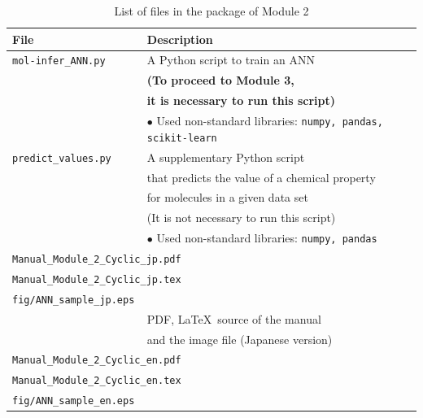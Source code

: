 \documentclass[11pt, titlepage, dvipdfmx, twoside]{article}
\begin{document}
\begin{table}[h!]
  \centering
  \caption{List of files in the package of Module 2}
  \label{tab:files}
  \begin{tabular}{lcll}
  \hline
  \bf File &\ \ & \multicolumn{2}{l}{\bf Description}\\
  \hline
  \verb|mol-infer_ANN.py| && \multicolumn{2}{l}{A Python script to train an ANN}\\
  &&\multicolumn{2}{l}{\bf (To proceed to Module 3,}\\
  &&\multicolumn{2}{l}{\bf it is necessary to run this script)}\\
  &&\multicolumn{2}{l}{$\bullet$ Used non-standard libraries: {\tt numpy, pandas, scikit-learn}}\\
  \hline
  \verb|predict_values.py| && \multicolumn{2}{l}{A supplementary Python script}\\
  &&\multicolumn{2}{l}{that predicts the value of a chemical property}\\
  &&\multicolumn{2}{l}{for molecules in a given data set}\\
  &&\multicolumn{2}{l}{(It is not necessary to run this script)}\\
  &&\multicolumn{2}{l}{$\bullet$ Used non-standard libraries: {\tt numpy, pandas}}\\
  \hline
  \multicolumn{4}{l}{\tt Manual\_Module\_2\_Cyclic\_jp.pdf}\\
  \multicolumn{4}{l}{\tt Manual\_Module\_2\_Cyclic\_jp.tex}\\
  \multicolumn{4}{l}{\tt fig/ANN\_sample\_jp.eps}\\
  &&\multicolumn{2}{l}{PDF, \LaTeX\  source of the manual}\\
  &&\multicolumn{2}{l}{and the image file (Japanese version)}\\
  \hline
  \multicolumn{4}{l}{\tt Manual\_Module\_2\_Cyclic\_en.pdf}\\
  \multicolumn{4}{l}{\tt Manual\_Module\_2\_Cyclic\_en.tex}\\
  \multicolumn{4}{l}{\tt fig/ANN\_sample\_en.eps}\\

\end{tabular}
\end{table}
\end{document}
